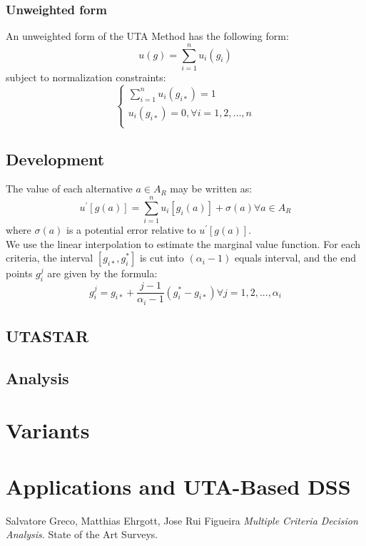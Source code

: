 \documentclass{report}
\begin{document}
\subsection{Unweighted form}
An unweighted form of the UTA Method has the following form: 
\begin{equation}
      u(g) = \sum_{i=1}^{n} u_i (g_i)
\end{equation}
subject to normalization constraints:\\
\begin{equation}
  \left\{
      \begin{aligned}
      \sum_{i=1}^{n} u_i(g_{i*}) = 1\\
       u_i(g_{i*}) = 0,  \forall i = 1, 2, ..., n\\
      \end{aligned}
    \right.
\end{equation}

\section{Development}
The value of each alternative $a \in A_R $ may be written as:
\begin{equation}
u^{'} [g(a)] = \sum_{i=1}^{n} u_i [g_i (a)] + \sigma (a)   \forall a \in A_R
\end{equation}
where $\sigma (a)$ is a potential error relative to $u^{'} [g(a)]$.\\

We use the linear interpolation to estimate the marginal value function. For each criteria, the interval $[g_{i*}, g_i^{*}]$ is cut into $(\alpha _i -1)$ equals interval, and the end points $g_i^{j}$ are given by the formula:
\begin{equation}
g_i^{j}= g_{i*} + \frac{j-1}{\alpha _i -1} (g_i^{*} - g_{i*})  \forall j = 1,2, ..., \alpha _i
\end{equation}

\section{UTASTAR}

\section{Analysis}

\chapter{Variants}

\chapter{Applications and UTA-Based DSS}

\begin{thebibliography}{9}
Salvatore Greco, Matthias Ehrgott, Jose Rui Figueira \textit{Multiple Criteria Decision Analysis}. 
State of the Art Surveys.
\end{thebibliography}
\end{document}
